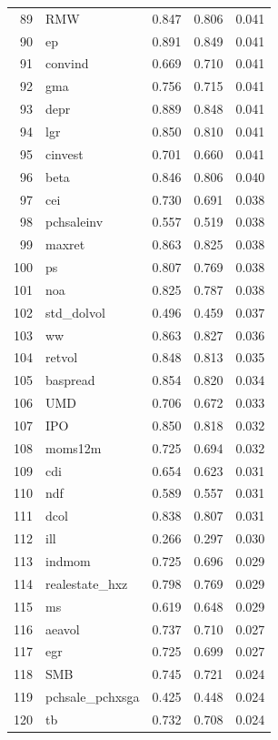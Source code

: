 \documentclass[12pt]{article}
\begin{document}
\begin{footnotesize}
\begin{longtable}{rl|c|c|c}
		89 & RMW & 0.847 & 0.806 & 0.041 \\ 
		90 & ep & 0.891 & 0.849 & 0.041 \\ 
		91 & convind & 0.669 & 0.710 & 0.041 \\ 
		92 & gma & 0.756 & 0.715 & 0.041 \\ 
		93 & depr & 0.889 & 0.848 & 0.041 \\ 
		94 & lgr & 0.850 & 0.810 & 0.041 \\ 
		95 & cinvest & 0.701 & 0.660 & 0.041 \\ 
		96 & beta & 0.846 & 0.806 & 0.040 \\ 
		97 & cei & 0.730 & 0.691 & 0.038 \\ 
		98 & pchsaleinv & 0.557 & 0.519 & 0.038 \\ 
		99 & maxret & 0.863 & 0.825 & 0.038 \\ 
		100 & ps & 0.807 & 0.769 & 0.038 \\ 
		101 & noa & 0.825 & 0.787 & 0.038 \\ 
		102 & std\_dolvol & 0.496 & 0.459 & 0.037 \\ 
		103 & ww & 0.863 & 0.827 & 0.036 \\ 
		104 & retvol & 0.848 & 0.813 & 0.035 \\ 
		105 & baspread & 0.854 & 0.820 & 0.034 \\ 
		106 & UMD & 0.706 & 0.672 & 0.033 \\ 
		107 & IPO & 0.850 & 0.818 & 0.032 \\ 
		108 & moms12m & 0.725 & 0.694 & 0.032 \\ 
		109 & cdi & 0.654 & 0.623 & 0.031 \\ 
		110 & ndf & 0.589 & 0.557 & 0.031 \\ 
		111 & dcol & 0.838 & 0.807 & 0.031 \\ 
		112 & ill & 0.266 & 0.297 & 0.030 \\ 
		113 & indmom & 0.725 & 0.696 & 0.029 \\ 
		114 & realestate\_hxz & 0.798 & 0.769 & 0.029 \\ 
		115 & ms & 0.619 & 0.648 & 0.029 \\ 
		116 & aeavol & 0.737 & 0.710 & 0.027 \\ 
		117 & egr & 0.725 & 0.699 & 0.027 \\ 
		118 & SMB & 0.745 & 0.721 & 0.024 \\ 
		119 & pchsale\_pchxsga & 0.425 & 0.448 & 0.024 \\ 
		120 & tb & 0.732 & 0.708 & 0.024 \\ 

\end{longtable}
\end{footnotesize}
\end{document}

